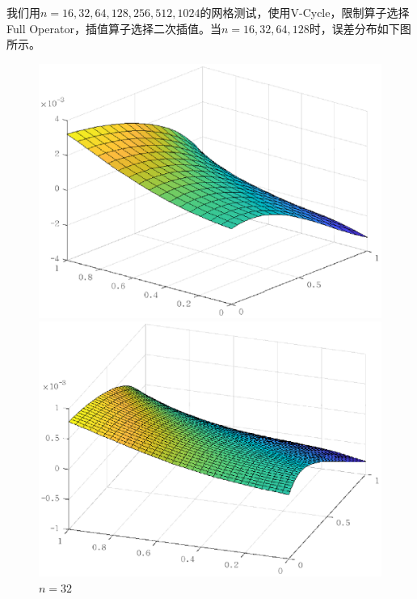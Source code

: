 \documentclass[lang=cn,10pt]{elegantbook}
\begin{document}
我们用$n=16,32,64,128,256,512,1024$的网格测试，使用V-Cycle，限制算子选择Full Operator，插值算子选择二次插值。当$n=16,32,64,128$时，误差分布如下图所示。
\begin{figure}[H]
  \centering
  \begin{minipage}[t]{0.24\linewidth}
      \centering
      \includegraphics[width=0.95\linewidth]{figure/3-2-1.eps}
      \caption*{$n=16$}
  \end{minipage}
  \begin{minipage}[t]{0.24\linewidth}
    \centering
    \includegraphics[width=0.95\linewidth]{figure/3-2-2.eps}
    \caption*{$n=32$}
  \end{minipage}
  \begin{minipage}[t]{0.24\linewidth}
    \centering

\end{minipage}
\end{figure}
\end{document}

